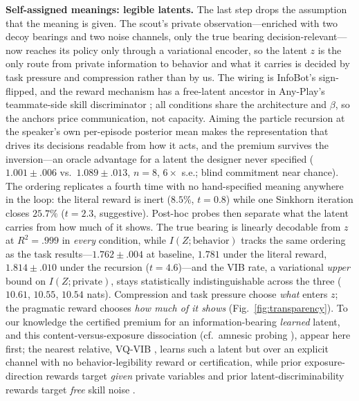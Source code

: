 \documentclass[sigconf,review,anonymous]{acmart}
\begin{document}
\textbf{Self-assigned meanings: legible latents.} The last step drops the assumption that the meaning is given. The scout's private observation---enriched with two decoy bearings and two noise channels, only the true bearing decision-relevant---now reaches its policy only through a variational encoder, so the latent $z$ is the only route from private information to behavior and what it carries is decided by task pressure and compression rather than by us. The wiring is InfoBot's \cite{goyal2019infobot} sign-flipped, and the reward mechanism has a free-latent ancestor in Any-Play's teammate-side skill discriminator \cite{lucas2022anyplay}; all conditions share the architecture and $\beta$, so the anchors price communication, not capacity. Aiming the particle recursion at the speaker's own per-episode posterior mean makes the representation that drives its decisions readable from how it acts, and the premium survives the inversion---an oracle advantage for a latent the designer never specified ($1.001\pm.006$ vs.\ $1.089\pm.013$, $n{=}8$, $6\times$ s.e.; blind commitment near chance). The ordering replicates a fourth time with no hand-specified meaning anywhere in the loop: the literal reward is inert ($8.5\%$, $t{=}0.8$) while one Sinkhorn iteration closes $25.7\%$ ($t{=}2.3$, suggestive). Post-hoc probes then separate what the latent carries from how much of it shows. The true bearing is linearly decodable from $z$ at $R^2{=}.999$ in \emph{every} condition, while $I(Z;\text{behavior})$ tracks the same ordering as the task results---$1.762\pm.004$ at baseline, $1.781$ under the literal reward, $1.814\pm.010$ under the recursion ($t{=}4.6$)---and the VIB rate, a variational \emph{upper} bound on $I(Z;\text{private})$, stays statistically indistinguishable across the three ($10.61$, $10.55$, $10.54$ nats). Compression and task pressure choose \emph{what} enters $z$; the pragmatic reward chooses \emph{how much of it shows} (Fig.~\ref{fig:transparency}). To our knowledge the certified premium for an information-bearing \emph{learned} latent, and this content-versus-exposure dissociation (cf.\ amnesic probing \cite{elazar2021amnesic}), appear here first; the nearest relative, VQ-VIB \cite{tucker2022trading}, learns such a latent but over an explicit channel with no behavior-legibility reward or certification, while prior exposure-direction rewards target \emph{given} private variables \cite{strouse2018learning,tian2020implicit,fuchs2021theory,liu2025active,faylor2025teammates} and prior latent-discriminability rewards target \emph{free} skill noise \cite{eysenbach2019diversity,lucas2022anyplay}.
\end{document}
